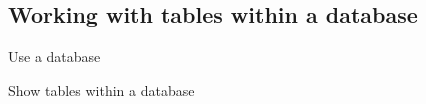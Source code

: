 
\subsection{Working with tables within a database}

Use a database

Show tables within a database

